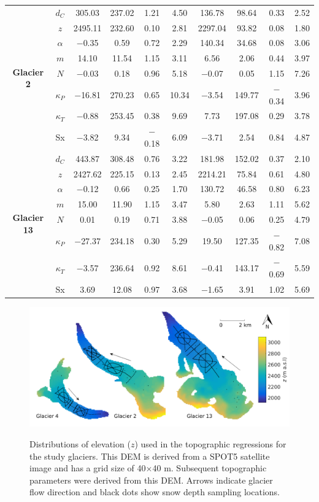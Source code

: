 \documentclass[12pt]{article}
\newcommand{\topomap}{Arrows indicate glacier flow direction and black dots show snow depth sampling locations. }
\begin{document}
\begin{landscape}
\begin{table}[]
\begin{tabular}{cc|cccc|cccc}
\multirow{8}{*}{\textbf{Glacier 2}} & $d_C$ & 305.03 & 237.02 & 1.21 & 4.50 & 136.78 & 98.64 & 0.33 & 2.52 \\
 & $z$ & 2495.11 & 232.60 & 0.10 & 2.81 & 2297.04 & 93.82 & 0.08 & 1.80 \\
 & $\alpha$ &  $-$0.35 & 0.59 & 0.72 & 2.29 & 140.34 & 34.68 & 0.08 & 3.06 \\
 & $m$ & 14.10 & 11.54 & 1.15 & 3.11 & 6.56 & 2.06 & 0.44 & 3.97 \\
 & $N$ &  $-$0.03 & 0.18 & 0.96 & 5.18 &  $-$0.07 & 0.05 & 1.15 & 7.26 \\
 & $\kappa_P$ &  $-$16.81 & 270.23 & 0.65 & 10.34 &  $-$3.54 & 149.77 &  $-$0.34 & 3.96 \\
 & $\kappa_T$ &  $-$0.88 & 253.45 & 0.38 & 9.69 & 7.73 & 197.08 & 0.29 & 3.78 \\
 & Sx &  $-$3.82 & 9.34 &  $-$0.18 & 6.09 &  $-$3.71 & 2.54 & 0.84 & 4.87 \\ \hline
\multirow{8}{*}{\textbf{Glacier 13}} & $d_C$ & 443.87 & 308.48 & 0.76 & 3.22 & 181.98 & 152.02 & 0.37 & 2.10 \\
 & $z$ & 2427.62 & 225.15 & 0.13 & 2.45 & 2214.21 & 75.84 & 0.61 & 4.80 \\
 & $\alpha$ &  $-$0.12 & 0.66 & 0.25 & 1.70 & 130.72 & 46.58 & 0.80 & 6.23 \\
 & $m$ & 15.00 & 11.90 & 1.15 & 3.47 & 5.80 & 2.63 & 1.11 & 5.62 \\
 & $N$ & 0.01 & 0.19 & 0.71 & 3.88 &  $-$0.05 & 0.06 & 0.25 & 4.79 \\
 & $\kappa_P$ &  $-$27.37 & 234.18 & 0.30 & 5.29 & 19.50 & 127.35 &  $-$0.82 & 7.08 \\
 & $\kappa_T$ &  $-$3.57 & 236.64 & 0.92 & 8.61 &  $-$0.41 & 143.17 &  $-$0.69 & 5.59 \\
 & Sx & 3.69 & 12.08 & 0.97 & 3.68 &  $-$1.65 & 3.91 & 1.02 & 5.69
\end{tabular}
\end{table}
\end{landscape}

\pagebreak
\begin{figure}[H]
	\centering
	\includegraphics[width = \textwidth]{Map_elevation.png}\\
	\caption{Distributions of elevation ($z$) used in the topographic regressions for the study glaciers. This DEM is derived from a SPOT5 satellite image and has a grid size of 40$\times$40 m. Subsequent topographic parameters were derived from this DEM. \topomap}
	\label{map:elev}
\end{figure}
\end{document}
